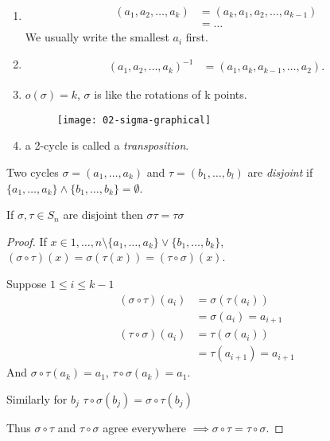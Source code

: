 \begin{remark} \mbox{}
\begin{enumerate}
\def\labelenumi{\roman{enumi}.}
\item
  \begin{align*}
   (a_1, a_2, \ldots, a_k) &= (a_k, a_1, a_2, \ldots, a_{k-1}) \\
   &= \ldots
  \end{align*} We usually write the smallest \(a_i\) first.
\item
  \begin{align*}
  (a_1, a_2, \ldots, a_k)^{-1} &= (a_1, a_k, a_{k-1}, \ldots, a_2).
  \end{align*}
\item
  \(o(\sigma) = k\), \(\sigma\) is like the rotations of k points.
  \begin{figure}
    \centering \texttt{[image: 02-sigma-graphical]}
  \end{figure} 
\item
  a 2-cycle is called a \emph{transposition}.
\end{enumerate}

\end{remark}

\begin{definition}
Two cycles \(\sigma = (a_1, \ldots, a_k)\) and \(\tau = (b_1, \ldots, b_l)\) are \emph{disjoint} if \(\{ a_1, \ldots, a_k \} \land \{ b_1, \ldots, b_k \} = \emptyset\).
\end{definition}

\begin{lemma}
\protect\hypertarget{lem:six}{}\label{lem:six}
If \(\sigma, \tau \in S_n\) are disjoint then \(\sigma \tau = \tau \sigma\)
\end{lemma}

\begin{proof}
If \(x \in {1, \ldots, n} \setminus \{ a_1, \ldots, a_k \} \lor \{ b_1, \ldots, b_k \}\), \((\sigma \circ \tau) (x) = \sigma \left( \tau(x) \right) = (\tau \circ \sigma)(x)\).

Suppose \(1 \leq i \leq k - 1\)
\begin{align*}
    (\sigma \circ \tau)(a_i) &= \sigma\left(\tau(a_i) \right) \\
    &= \sigma(a_i) = a_{i + 1} \\
    (\tau \circ \sigma)(a_i) &= \tau\left(\sigma(a_i) \right) \\
    &= \tau(a_{i + 1}) = a_{i + 1}
\end{align*}
And \(\sigma \circ \tau (a_k) = a_1\), \(\tau \circ \sigma (a_k) = a_1\).

Similarly for \(b_j\)
\(\tau \circ \sigma (b_j) = \sigma \circ \tau (b_j)\)

Thus \(\sigma \circ \tau\) and \(\tau \circ \sigma\) agree everywhere \(\implies \sigma \circ \tau = \tau \circ \sigma\).
\end{proof}

